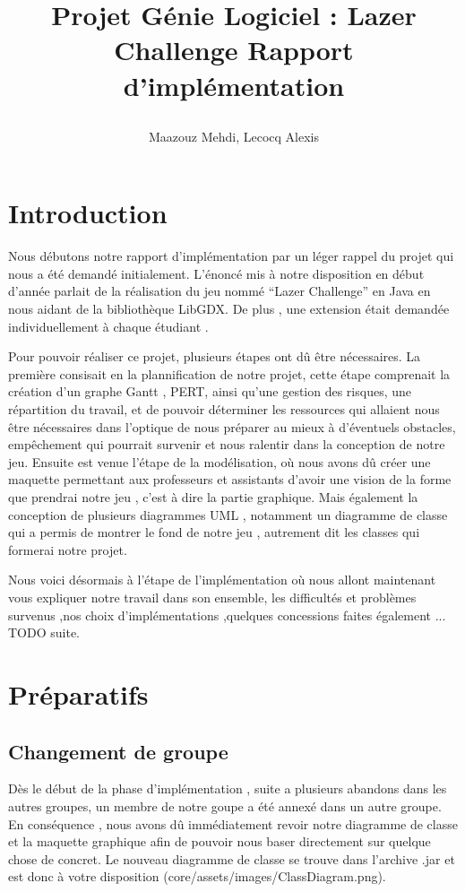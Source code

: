 \documentclass[a4paper,10pt]{article}
\title{
    \begin{minipage}\linewidth
        \centering\bfseries\sffamily
        Projet Génie Logiciel : Lazer Challenge
        \vskip3pt
        \large Rapport d'implémentation
    \end{minipage}
    }
\author{Maazouz Mehdi, Lecocq Alexis}
\begin{document}
\maketitle
\tableofcontents
\newpage
\section{Introduction}
  Nous débutons notre rapport d'implémentation par un léger rappel du projet qui nous a été demandé initialement. 
L'énoncé mis à notre disposition en début d'année parlait de la réalisation du jeu nommé ``Lazer Challenge'' en Java
en nous aidant de la bibliothèque LibGDX. De plus , une extension était demandée individuellement à chaque étudiant .

Pour pouvoir réaliser ce projet, plusieurs étapes ont dû être nécessaires. La première consisait en la plannification de notre projet,
 cette étape comprenait la création d'un graphe Gantt , PERT, ainsi qu'une gestion des risques, une répartition du travail,
 et de pouvoir déterminer les ressources qui allaient nous être nécessaires dans l'optique de nous préparer au mieux à d'éventuels
 obstacles, empêchement qui pourrait survenir et nous ralentir dans la conception de notre jeu. Ensuite est venue l'étape de la modélisation, où nous
 avons dû créer une maquette permettant aux professeurs et assistants d'avoir une vision de la forme que prendrai notre jeu , c'est à dire la partie graphique.
 Mais également la conception de plusieurs diagrammes UML , notamment un diagramme de classe qui a permis de montrer le fond de notre jeu , autrement dit les classes
 qui formerai notre projet.
 
 Nous voici désormais à l'étape de l'implémentation où nous allont maintenant vous expliquer notre travail dans son ensemble,
 les difficultés et problèmes survenus ,nos choix d'implémentations ,quelques concessions faites également ... TODO suite.
\section{Préparatifs}
\subsection{Changement de groupe} 
Dès le début de la phase d'implémentation , suite a plusieurs abandons dans les autres groupes, un membre de notre goupe a été annexé dans un autre groupe.
En conséquence , nous avons dû immédiatement revoir notre diagramme de classe et la maquette graphique afin de pouvoir nous baser directement sur quelque chose
de concret. Le nouveau diagramme de classe se trouve dans l'archive .jar et est donc à votre disposition (core/assets/images/ClassDiagram.png).
\end{document}
